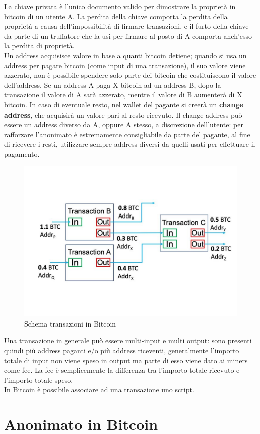 La chiave privata è l’unico documento valido per dimostrare la proprietà in bitcoin di un utente A.
La perdita della chiave comporta la perdita della proprietà a causa dell’impossibilità di ﬁrmare transazioni, e il furto della chiave da parte di un truﬀatore che la usi per ﬁrmare al posto di A comporta anch’esso la perdita di proprietà.\\Un address acquisisce valore in base a quanti bitcoin detiene; quando si usa un address per pagare bitcoin (come input di una transazione), il suo valore viene azzerato, non è possibile spendere solo parte dei bitcoin che costituiscono il valore dell’address. Se un address A paga X bitcoin ad un address B, dopo la transazione il valore di A sarà azzerato, mentre il valore di B aumenterà di X bitcoin. In caso di eventuale resto, nel wallet del pagante si creerà un \textbf{change address}, che acquisirà un valore pari al resto ricevuto. Il change address può essere un address diverso da A, oppure A stesso, a discrezione dell’utente: per rafforzare l’anonimato è estremamente consigliabile da parte del pagante, al fine di ricevere i resti, utilizzare sempre address diversi da quelli usati per effettuare il pagamento.
\begin{figure}[h!]
    \centering
    \includegraphics[scale=0.4, trim = 1cm 2cm 0cm 3cm, clip]{Images/Transactions-input-and-output-in-blockchain.jpg.pdf}
    \caption{Schema transazioni in Bitcoin}
    \label{fig:transaction}
\end{figure}
\FloatBarrier
Una transazione in generale può essere multi-input e multi output: sono presenti quindi più address paganti e/o più address riceventi, generalmente l'importo totale di input non viene speso in output ma parte di esso viene dato ai miners come fee. La fee è semplicemente la differenza tra l'importo totale ricevuto e l'importo totale speso.\\
In Bitcoin è possibile associare ad una transazione uno script.
\section{Anonimato in Bitcoin}


